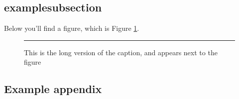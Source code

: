 \documentclass[12pt,letterpaper]{article}
\begin{document}
    \lipsum
    \subsection{examplesubsection}
      Below you'll find a figure, which is Figure \ref{fig:examplefigure}.

      \lipsum[1]
      \begin{figure}[h!]
        \centering
        \rule{1 cm}{1 cm}
        \caption[Short caption for List of Figures]{This is the long version of the caption, and appears next to the figure}
        \label{fig:examplefigure}
      \end{figure}
      \lipsum[2]
  \clearpage
  
  
  \clearpage
  \begin{appendices}
    \section{Example appendix}
      \lipsum[3]
  \end{appendices}
\end{document}

